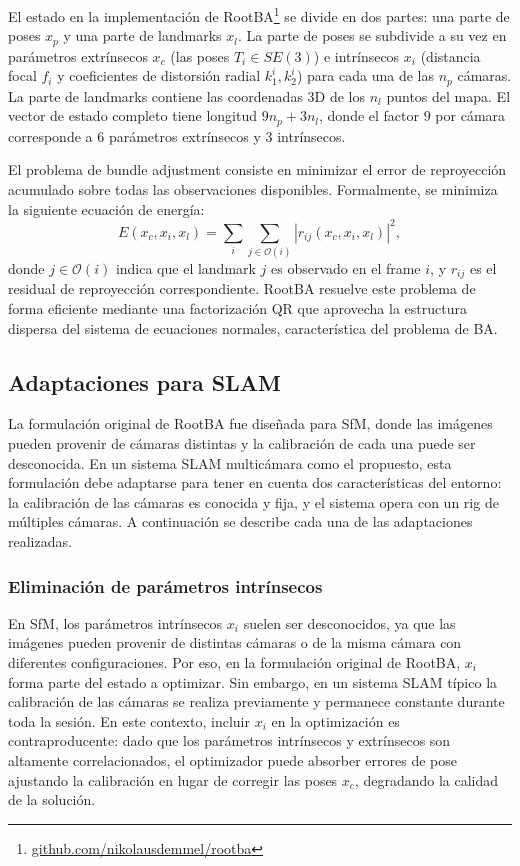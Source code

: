 El estado en la implementación de RootBA\footnote{\href{https://github.com/nikolausdemmel/rootba}{github.com/nikolausdemmel/rootba}} se divide en dos partes: una parte de poses $x_p$ y una parte de landmarks $x_l$. La parte de poses se subdivide a su vez en parámetros extrínsecos $x_c$ (las poses ${T_i \in SE(3)}$) e intrínsecos $x_i$ (distancia focal $f_i$ y coeficientes de distorsión radial $k_1^i, k_2^i$) para cada una de las $n_p$ cámaras. La parte de landmarks contiene las coordenadas 3D de los $n_l$ puntos del mapa. El vector de estado completo tiene longitud $9n_p + 3n_l$, donde el factor $9$ por cámara corresponde a $6$ parámetros extrínsecos y $3$ intrínsecos.

El problema de bundle adjustment consiste en minimizar el error de reproyección acumulado sobre todas las observaciones disponibles. Formalmente, se minimiza la siguiente ecuación de energía:
\begin{equation}
E(x_c, x_i, x_l) = \sum_{i}\sum_{j \in \mathcal{O}(i)} |r_{ij}(x_c, x_i, x_l)|^2,
\label{eq:ba_energy}
\end{equation}
donde $j \in \mathcal{O}(i)$ indica que el landmark $j$ es observado en el frame $i$, y $r_{ij}$ es el residual de reproyección correspondiente. RootBA resuelve este problema de forma eficiente mediante una factorización QR que aprovecha la estructura dispersa del sistema de ecuaciones normales, característica del problema de BA.

\subsection{Adaptaciones para SLAM}

La formulación original de RootBA fue diseñada para SfM, donde las imágenes pueden provenir de cámaras distintas y la calibración de cada una puede ser desconocida. En un sistema SLAM multicámara como el propuesto, esta formulación debe adaptarse para tener en cuenta dos características del entorno: la calibración de las cámaras es conocida y fija, y el sistema opera con un rig de múltiples cámaras. A continuación se describe cada una de las adaptaciones realizadas.

\subsubsection{Eliminación de parámetros intrínsecos}

En SfM, los parámetros intrínsecos $x_i$ suelen ser desconocidos, ya que las imágenes pueden provenir de distintas cámaras o de la misma cámara con diferentes configuraciones. Por eso, en la formulación original de RootBA, $x_i$ forma parte del estado a optimizar. Sin embargo, en un sistema SLAM típico la calibración de las cámaras se realiza previamente y permanece constante durante toda la sesión. En este contexto, incluir $x_i$ en la optimización es contraproducente: dado que los parámetros intrínsecos y extrínsecos son altamente correlacionados, el optimizador puede absorber errores de pose ajustando la calibración en lugar de corregir las poses $x_c$, degradando la calidad de la solución.

